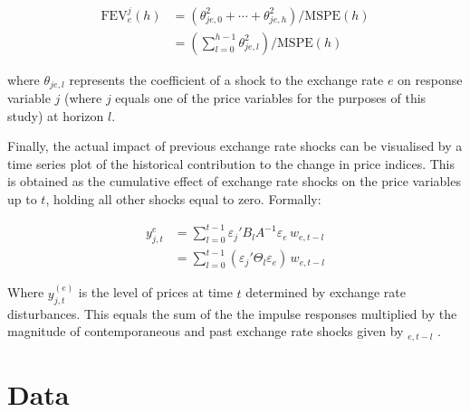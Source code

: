 \documentclass[12pt]{article}
\begin{document}
\begin{align} \label{eq:fevd_sum}
    \text{FEV}_{e}^{j}(h) &= (\theta_{je, 0}^{2} + \cdots + \theta_{je, h}^{2}) / \text{MSPE}(h) \\ &= (\sum_{l=0}^{h-1} \theta_{je, l}^{2}) / \text{MSPE}(h)
\end{align}

where $\theta_{je, l}$ represents the coefficient of a shock to the exchange rate $e$ on response variable $j$ (where $j$ equals one of the price variables for the purposes of this study) at horizon $l$.

Finally, the actual impact of previous exchange rate shocks can be visualised by a time series plot of the historical contribution to the change in price indices. This is obtained as the cumulative effect of exchange rate shocks on the price variables up to $t$, holding all other shocks equal to zero. Formally: 

\begin{align} \label{eq:hd}
    y_{j,t}^{e} &= \sum_{l=0}^{t-1} \varepsilon_j' B_l A^{-1} \varepsilon_e \, w_{e,t-l} \\ &= \sum_{l=0}^{t-1} (\varepsilon_j' \Theta_l \varepsilon_e)\, w_{e,t-l}
\end{align}

Where $y_{j,t}^{(e)}$ is the level of prices at time $t$ determined by exchange rate disturbances. This equals the sum of the the impulse responses  multiplied by the magnitude of contemporaneous and past exchange rate shocks given by $_{e,t-l}$ \parencite{Kilian_Lütkepohl_ch4}.

\pagebreak

 \section{Data}
\end{document}
